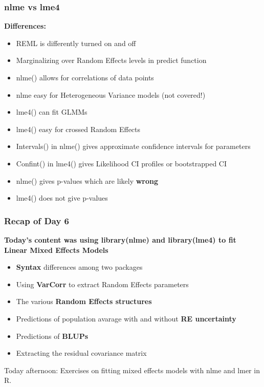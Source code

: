 \documentclass{beamer}
\begin{document}
\begin{frame}[fragile]
    \frametitle{nlme vs lme4}
    \textbf{Differences:}
    \begin{itemize}
        \item REML is differently turned on and off
        \item Marginalizing over Random Effects levels in predict function
        \item nlme() allows for correlations of data points
        \item nlme easy for Heterogeneous Variance models (not covered!)
        \item lme4() can fit GLMMs
        \item lme4() easy for crossed Random Effects
        \item Intervals() in nlme() gives approximate confidence intervals for parameters
        \item Confint() in lme4() gives Likelihood CI profiles or bootstrapped CI
        \item nlme() gives p-values which are likely \textbf{wrong}
        \item lme4() does not give p-values
    \end{itemize}
\end{frame}

\begin{frame}
    \frametitle{Recap of Day 6}
    \textbf{Today's content was using library(nlme) and library(lme4) to fit Linear Mixed Effects Models}
    \vspace{0.5cm}
    
    \begin{itemize}
        \item \textbf{Syntax} differences among two packages
        \item Using \textbf{VarCorr} to extract Random Effects parameters
        \item The various \textbf{Random Effects structures}
        \item Predictions of population avarage with and without \textbf{RE uncertainty}
        \item Predictions of \textbf{BLUPs}
        \item Extracting the residual covariance matrix
    \end{itemize}
    \vspace{0.5cm}
    
    Today afternoon: Exercises on fitting mixed effects models with nlme and lmer in R.
\end{frame}
\end{document}
